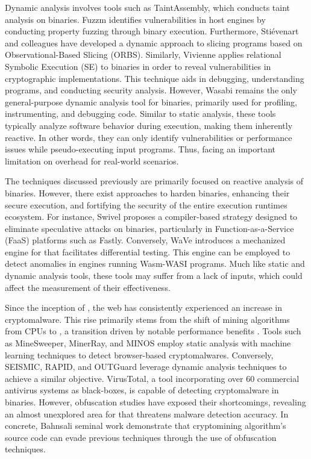  Dynamic analysis involves tools such as TaintAssembly\cite{taintassembly}, which conducts taint analysis on \Wasm binaries. 
Fuzzm\cite{fuzzm} identifies vulnerabilities in host engines by conducting property fuzzing through \Wasm binary execution. 
Furthermore, Stiévenart and colleagues have developed a dynamic approach to slicing \Wasm programs based on Observational-Based Slicing (ORBS)\cite{slicing, slicing2}.
Similarly, Vivienne applies relational Symbolic Execution (SE) to \Wasm binaries in order to reveal vulnerabilities in cryptographic implementations\cite{Vivienne}. 
This technique aids in debugging, understanding programs, and conducting security analysis.
However, Wasabi\cite{wasabi} remains the only general-purpose dynamic analysis tool for \Wasm binaries, primarily used for profiling, instrumenting, and debugging \Wasm code. 
Similar to static analysis, these tools typically analyze software behavior during execution, making them inherently reactive. 
In other words, they can only identify vulnerabilities or performance issues while pseudo-executing input \wasm programs.
Thus, facing an important limitation on overhead for real-world scenarios. 

The techniques discussed previously are primarily focused on reactive analysis of \Wasm binaries.
However, there exist approaches to harden \Wasm binaries, enhancing their secure execution, and fortifying the security of the entire execution runtimes ecosystem. 
For instance, Swivel\cite{Swivel} proposes a compiler-based strategy designed to eliminate speculative attacks on \Wasm binaries, particularly in Function-as-a-Service (FaaS) platforms such as Fastly. 
Conversely, WaVe\cite{wave} introduces a mechanized engine for \Wasm that facilitates differential testing. 
This engine can be employed to detect anomalies in engines running Wasm-WASI programs. 
Much like static and dynamic analysis tools, these tools may suffer from a lack of \Wasm inputs, which could affect the measurement of their effectiveness.


 Since the inception of \wasm, the web has consistently experienced an increase in cryptomalware. 
This rise primarily stems from the shift of mining algorithms from CPUs to \wasm, a transition driven by notable performance benefits \cite{musch2019new}.
Tools such as MineSweeper\cite{Minesweeper}, MinerRay\cite{MinerRay}, and MINOS\cite{MINOS} employ static analysis with machine learning techniques to detect browser-based cryptomalwares.
Conversely, SEISMIC\cite{SEISMIC}, RAPID\cite{RAPID}, and OUTGuard\cite{outguard} leverage dynamic analysis techniques to achieve a similar objective.
VirusTotal, a tool incorporating over 60 commercial antivirus systems as black-boxes, is capable of detecting cryptomalware in \wasm binaries.
However, obfuscation studies have exposed their shortcomings, revealing an almost unexplored area for \Wasm that threatens malware detection accuracy.
In concrete, Bahnsali \etal seminal work\cite{10.1145/3507657.3528560} demonstrate that cryptomining algorithm's source code can evade previous techniques through the use of obfuscation techniques.



